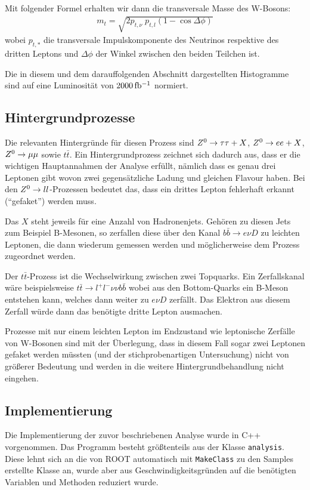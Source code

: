 Mit folgender Formel erhalten wir dann die transversale Masse des W-Bosons: 
\begin{align}
  m_t = \sqrt{2 p_{t,\nu}\; p_{t,l} (1 - \cos{\Delta\phi})}
  \label{eqn:trans}
\end{align}
wobei $p_{t,*}$ die transversale Impulskomponente des Neutrinos respektive des
dritten Leptons und $\Delta\phi$ der Winkel zwischen den beiden Teilchen ist.

Die in diesem und dem darauffolgenden Abschnitt dargestellten Histogramme sind
auf eine Luminosität von $\unit[2000]{fb^{-1}}$ normiert.

\subsection{Hintergrundprozesse}
Die relevanten Hintergründe für diesen Prozess sind $Z^0\to\tau\tau + X$, $Z^0\to
e e + X$, $Z^0\to\mu\mu$ sowie $t\bar{t}$. Ein Hintergrundprozess zeichnet sich
dadurch aus, dass er die wichtigen Hauptannahmen der Analyse erfüllt, nämlich
dass es genau drei Leptonen gibt wovon zwei gegensätzliche Ladung und gleichen
Flavour haben. Bei den $Z^0\to ll$-Prozessen bedeutet das, dass ein drittes
Lepton fehlerhaft erkannt ("`gefaket"') werden muss.

Das $X$ steht jeweils für eine Anzahl von Hadronenjets. Gehören zu diesen Jets
zum Beispiel B-Mesonen, so zerfallen diese über den Kanal $b\bar{b}\to e\nu D$
zu leichten Leptonen, die dann wiederum gemessen werden und möglicherweise dem
Prozess zugeordnet werden.

Der $t\bar{t}$-Prozess ist die Wechselwirkung zwischen zwei Topquarks. Ein
Zerfallskanal wäre beispielsweise $t\bar t\to l^+l^-\nu\nu b\bar{b}$ wobei aus
den Bottom-Quarks ein B-Meson entstehen kann, welches dann weiter zu $e\nu D$
zerfällt. Das Elektron aus diesem Zerfall würde dann das benötigte dritte Lepton
ausmachen.

Prozesse mit nur einem leichten Lepton im Endzustand wie leptonische Zerfälle
von W-Bosonen sind mit der Überlegung, dass in diesem Fall sogar zwei Leptonen
gefaket werden müssten (und der stichprobenartigen Untersuchung) nicht von
größerer Bedeutung und werden in die weitere Hintergrundbehandlung nicht
eingehen.

\subsection{Implementierung}
Die Implementierung der zuvor beschriebenen Analyse wurde in C++ vorgenommen.
Das Programm besteht größtenteils aus der Klasse \lstinline!analysis!. Diese
lehnt sich an die von ROOT automatisch mit \lstinline!MakeClass! zu den Samples
erstellte Klasse an, wurde aber aus Geschwindigkeitsgründen auf die benötigten
Variablen und Methoden reduziert wurde.

